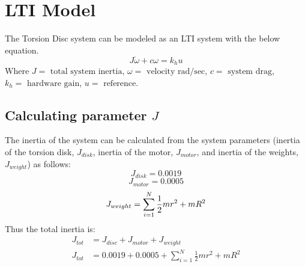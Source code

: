 \documentclass[11pt,titlepage]{article}
\begin{document}
\section{LTI Model} \label{sec:LTI}
    The Torsion Disc system can be modeled as an LTI system with the below equation.
    \begin{equation} \label{eq:lti}
        J\dot{\omega}+c\omega=k_hu
    \end{equation}
    Where $J=\mbox{ total system inertia}$, $\omega=\mbox{ velocity rad/sec}$, $c=\mbox{ system drag}$, $k_h=\mbox{ hardware gain}$, $u=\mbox{ reference}$.

    \subsection{Calculating parameter $J$}
        The inertia of the system can be calculated from the system parameters (inertia of the torsion disk, $J_{disk}$, inertia of the motor, $J_{motor}$, and inertia of the weights, $J_{weight}$) as follows:
        $$J_{disk}=0.0019$$
        $$J_{motor}=0.0005$$
        \begin{equation}
            J_{weight}=\sum\limits_{i=1}^{N} \frac{1}{2}mr^2 + mR^2\\
        \end{equation}
        Thus the total inertia is:
        \begin{align}
            J_{tot}&=J_{disc}+J_{motor}+J_{weight}\nonumber\\
            J_{tot}&=0.0019+0.0005+\sum\limits_{i=1}^{N} \frac{1}{2}mr^2 + mR^2
        \end{align}
\end{document}
